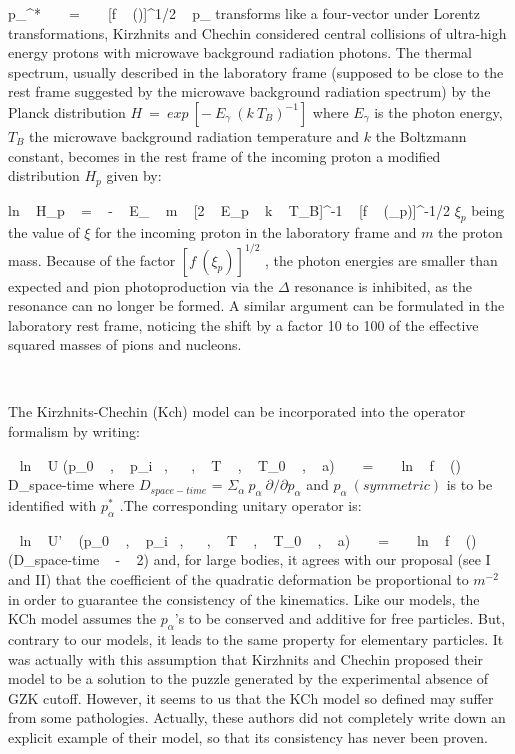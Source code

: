 \documentclass[a4paper,12pt,dvips]{article}
\begin{document}
\equation
p_{\alpha}^* ~ ~ = ~ ~ [f ~ (\xi )]^{1/2}
 ~ p_{\alpha}
\endequation
\noindent
transforms like a four-vector under Lorentz transformations, Kirzhnits and Chechin considered central collisions of ultra-high energy protons with microwave background radiation photons. The thermal spectrum, usually described in the laboratory frame (supposed to be close to the rest frame suggested by the microwave background radiation spectrum) by the Planck distribution $H ~ = ~ exp ~ [- ~ E_{\gamma } ~ (k ~ T_B)^{-1}]$ where $E_{\gamma }$ is the photon energy, $T_B$ the microwave background radiation temperature and $k$ the Boltzmann constant, becomes in the rest frame of the incoming proton a modified distribution $H_p$ given by:

\equation
ln ~ H_p ~ = ~ - ~ E_{\gamma } ~ m ~ [2 ~ E_p ~ k ~ T_B]^{-1} ~ [f ~ (\xi _p)]^{-1/2}
\endequation
\noindent
$\xi _p$ being the value of $\xi $ for the incoming proton in the laboratory frame and $m$ the proton mass. Because of the factor $[f ~ (\xi _p)]^{1/2}$ , the photon energies are smaller than expected and pion photoproduction via the $\Delta $ resonance is inhibited, as the resonance can no longer be formed. A similar argument can be formulated in the laboratory rest frame, noticing the shift by a factor 10 to 100 of the effective squared masses of pions and nucleons.

~ 

The Kirzhnits-Chechin (Kch) model can be incorporated into the operator formalism by writing:

 ~ ln ~ U (p_0 ~ , ~ p_i ~,~ \sigma  ~ , ~ T ~ , ~ T_0 ~ , ~ a) ~ ~ = ~ ~ ln ~ f ~ (\xi )~ ~ D_{space-time}
\endequation
\noindent
where $ D_{space-time}$ = $\Sigma _{\alpha } ~ p_{\alpha} ~ \partial /\partial p_\alpha $ and $p_{\alpha } ~ (symmetric)$ is to be identified with $ p_{\alpha}^*$ .The corresponding unitary operator is:

 ~ ln ~ U' ~ (p_0 ~ , ~ p_i ~,~ \sigma ~ , ~ T ~ , ~ T_0 ~ , ~ a) ~ ~ = ~ ~ ln ~ f ~ (\xi )~ ~ (D_{space-time} ~ - ~ 2)
\endequation
\noindent
and, for large bodies, it agrees with our proposal (see I and II) that the coefficient of the quadratic deformation be proportional to $m^{-2}$ in order to guarantee the consistency of the kinematics. Like our models, the KCh model assumes the $p_{\alpha}$'s to be conserved and additive for free particles. But, contrary to our models, it leads to the same property for elementary particles. It was actually with this assumption that Kirzhnits and Chechin proposed their model to be a solution to the puzzle generated by the experimental absence of GZK cutoff. However, it seems to us that the KCh model so defined may suffer from some pathologies. Actually, these authors did not completely write down an explicit example of their model, so that its consistency has never been proven.
\end{document}
